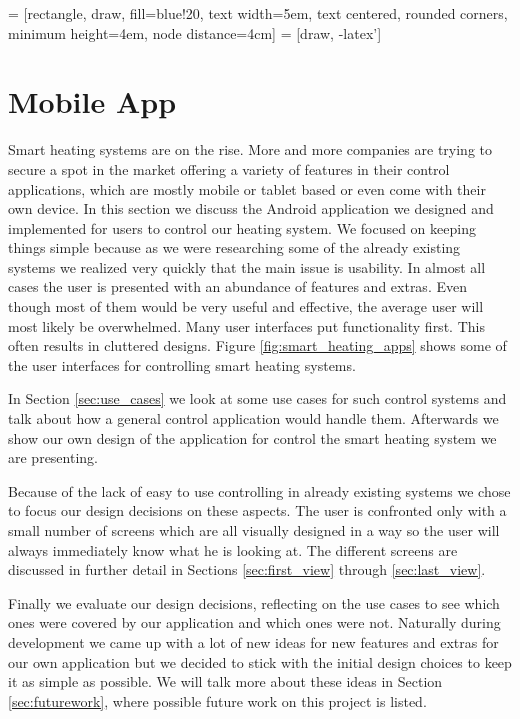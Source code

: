  = [rectangle, draw, fill=blue!20, 
    text width=5em, text centered, rounded corners, minimum height=4em, node distance=4cm]
 = [draw, -latex']

\chapter{Mobile App}
\label{sec:mobile_app}

Smart heating systems are on the rise. More and more companies are trying to secure a spot in the market offering a variety of features in their control applications, which are mostly mobile or tablet based or even come with their own device. In this section we discuss the Android application we designed and implemented for users to control our heating system. We focused on keeping things simple because as we were researching some of the already existing systems we realized very quickly that the main issue is usability. In almost all cases the user is presented with an abundance of features and extras. Even though most of them would be very useful and effective, the average user will most likely be overwhelmed. Many user interfaces put functionality first. This often results in cluttered designs. Figure \ref{fig:smart_heating_apps} shows some of the user interfaces for controlling smart heating systems. 

In Section \ref{sec:use_cases} we look at some use cases for such control systems and talk about how a general control application would handle them. Afterwards we show our own design of the application for control the smart heating system we are presenting.

Because of the lack of easy to use controlling in already existing systems we chose to focus our design decisions on these aspects. The user is confronted only with a small number of screens which are all visually designed in a way so the user will always immediately know what he is looking at. The different screens are discussed in further detail in Sections \ref{sec:first_view} through \ref{sec:last_view}.

Finally we evaluate our design decisions, reflecting on the use cases to see which ones were covered by our application and which ones were not. Naturally during development we came up with a lot of new ideas for new features and extras for our own application but we decided to stick with the initial design choices to keep it as simple as possible. We will talk more about these ideas in Section \ref{sec:futurework}, where possible future work on this project is listed.

